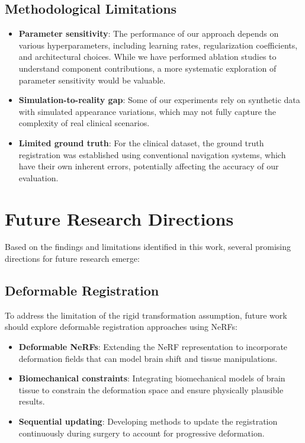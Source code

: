 \subsection{Methodological Limitations}

\begin{itemize}
    \item \textbf{Parameter sensitivity}: The performance of our approach depends on various hyperparameters, including learning rates, regularization coefficients, and architectural choices. While we have performed ablation studies to understand component contributions, a more systematic exploration of parameter sensitivity would be valuable.
    
    \item \textbf{Simulation-to-reality gap}: Some of our experiments rely on synthetic data with simulated appearance variations, which may not fully capture the complexity of real clinical scenarios.
    
    \item \textbf{Limited ground truth}: For the clinical dataset, the ground truth registration was established using conventional navigation systems, which have their own inherent errors, potentially affecting the accuracy of our evaluation.
\end{itemize}

\section{Future Research Directions}

Based on the findings and limitations identified in this work, several promising directions for future research emerge:

\subsection{Deformable Registration}

To address the limitation of the rigid transformation assumption, future work should explore deformable registration approaches using NeRFs:

\begin{itemize}
    \item \textbf{Deformable NeRFs}: Extending the NeRF representation to incorporate deformation fields that can model brain shift and tissue manipulations.
    
    \item \textbf{Biomechanical constraints}: Integrating biomechanical models of brain tissue to constrain the deformation space and ensure physically plausible results.
    
    \item \textbf{Sequential updating}: Developing methods to update the registration continuously during surgery to account for progressive deformation.
\end{itemize}

